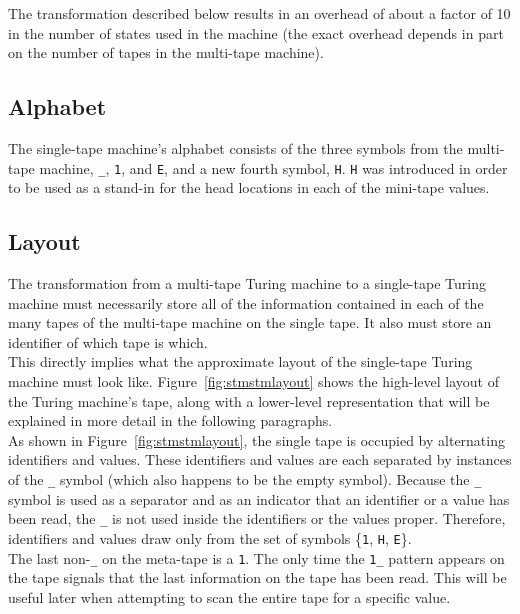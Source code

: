 The transformation described below results in an overhead of about a factor of 10 in the number of states used in the machine (the exact overhead depends in part on the number of tapes in the multi-tape machine). 

\subsection{Alphabet}

The single-tape machine's alphabet consists of the three symbols from the multi-tape machine, \texttt{\_}, \texttt{1}, and \texttt{E}, and a new fourth symbol, \texttt{H}. \texttt{H} was introduced in order to be used as a stand-in for the head locations in each of the mini-tape values.

\subsection{Layout}

The transformation from a multi-tape Turing machine to a single-tape Turing machine must necessarily store all of the information contained in each of the many tapes of the multi-tape machine on the single tape. It also must store an identifier of which tape is which. \\

This directly implies what the approximate layout of the single-tape Turing machine must look like. Figure~\ref{fig:stmstmlayout} shows the high-level layout of the Turing machine's tape, along with a lower-level representation that will be explained in more detail in the following paragraphs. \\

As shown in Figure~\ref{fig:stmstmlayout}, the single tape is occupied by alternating identifiers and values. These identifiers and values are each separated by instances of the \texttt{\_} symbol (which also happens to be the empty symbol). Because the \texttt{\_} symbol is used as a separator and as an indicator that an identifier or a value has been read, the \texttt{\_} is not used inside the identifiers or the values proper. Therefore, identifiers and values draw only from the set of symbols \{\texttt{1}, \texttt{H}, \texttt{E}\}. \\

The last non-\texttt{\_} on the meta-tape is a \texttt{1}. The only time the \texttt{1\_} pattern appears on the tape signals that the last information on the tape has been read. This will be useful later when attempting to scan the entire tape for a specific value.

